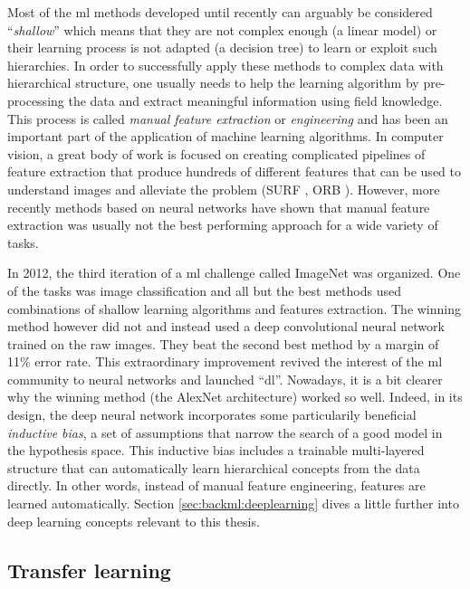 Most of the \acrlong{ml} methods developed until recently can arguably be considered ``\textit{shallow}'' which means that they are not complex enough (\eg a linear model) or their learning process is not adapted (\eg a decision tree) to learn or exploit such hierarchies. In order to successfully apply these methods to complex data with hierarchical structure, one usually needs to help the learning algorithm by pre-processing the data and extract meaningful information using field knowledge. This process is called \textit{manual feature extraction} or \textit{engineering} and has been an important part of the application of machine learning algorithms. In computer vision, a great body of work is focused on creating complicated pipelines of feature extraction that produce hundreds of different features that can be used to understand images and alleviate the problem (\eg SURF \parencite{bay2006surf}, ORB \parencite{rublee2011orb}). However, more recently methods based on neural networks have shown that manual feature extraction was usually not the best performing approach for a wide variety of tasks.

In 2012, the third iteration of a \acrlong{ml} challenge called ImageNet \parencite{russakovsky2015imagenet} was organized. One of the tasks was image classification and all but the best methods used combinations of shallow learning algorithms and features extraction. The winning method \parencite{krizhevsky2012imagenet} however did not and instead used a deep convolutional neural network trained on the raw images. They beat the second best method by a margin of 11\% error rate. This extraordinary improvement revived the interest of the \acrlong{ml} community to neural networks and launched ``\acrlong{dl}''. Nowadays, it is a bit clearer why the winning method (\ie the AlexNet architecture) worked so well. Indeed, in its design, the deep neural network incorporates some particularily beneficial \textit{inductive bias}, a set of assumptions that narrow the search of a good model in the hypothesis space. This inductive bias includes a trainable multi-layered structure that can automatically learn hierarchical concepts from the data directly. In other words, instead of manual feature engineering, features are learned automatically. Section \ref{sec:backml:deeplearning} dives a little further into deep learning concepts relevant to this thesis.

\subsection{Transfer learning}
\label{ssec:backml:transfer}

